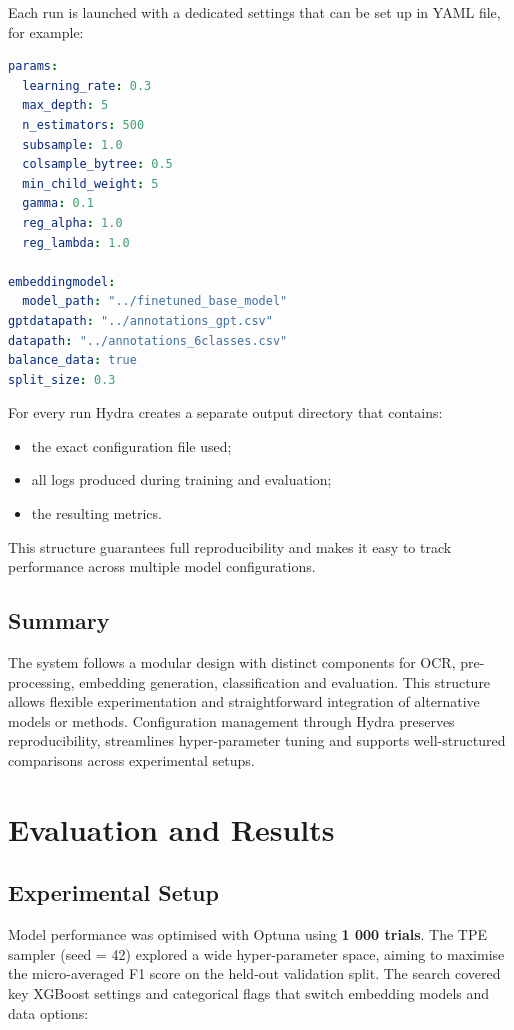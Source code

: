 \documentclass{SGGW-thesis-EN}
\begin{document}
Each run is launched with a dedicated settings that can be set up in YAML file, for example:
\begin{lstlisting}[language=yaml, caption=Sample Hydra configuration]
params:
  learning_rate: 0.3
  max_depth: 5
  n_estimators: 500
  subsample: 1.0
  colsample_bytree: 0.5
  min_child_weight: 5
  gamma: 0.1
  reg_alpha: 1.0
  reg_lambda: 1.0

embeddingmodel:
  model_path: "../finetuned_base_model"
gptdatapath: "../annotations_gpt.csv"
datapath: "../annotations_6classes.csv"
balance_data: true
split_size: 0.3
\end{lstlisting}

For every run Hydra creates a separate output directory that contains:
\begin{itemize}
  \item the exact configuration file used;
  \item all logs produced during training and evaluation;
  \item the resulting metrics.
\end{itemize}

This structure guarantees full reproducibility and makes it easy to track performance across multiple model
configurations.

\section{Summary}
The system follows a modular design with distinct components for OCR, pre-processing, embedding generation, classification
and evaluation. This structure allows flexible experimentation and straightforward integration of alternative models or
methods. Configuration management through Hydra preserves reproducibility, streamlines hyper-parameter tuning and
supports well-structured comparisons across experimental setups.


\chapter{Evaluation and Results}
\section{Experimental Setup}
Model performance was optimised with Optuna using \textbf{1 000 trials}. The TPE sampler (seed = 42) explored a wide
hyper-parameter space, aiming to maximise the micro-averaged F1 score on the held-out validation split.
The search covered key XGBoost settings and categorical flags that switch embedding models and data options:
\end{document}
